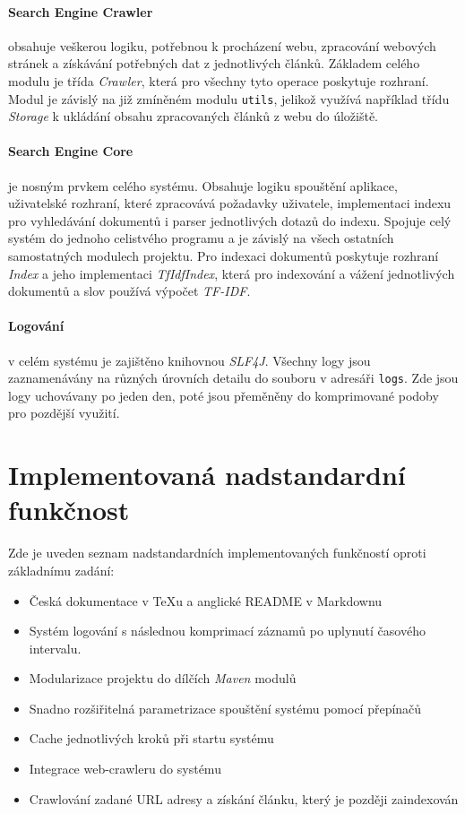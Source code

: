 \documentclass{article}
\begin{document}
\paragraph{Search Engine Crawler} obsahuje veškerou logiku, potřebnou k procházení webu, zpracování webových stránek a získávání potřebných dat z jednotlivých článků. Základem celého modulu je třída \textit{Crawler}, která pro všechny tyto operace poskytuje rozhraní. Modul je závislý na již zmíněném modulu \texttt{utils}, jelikož využívá například třídu \textit{Storage} k ukládání obsahu zpracovaných článků z webu do úložiště.

\paragraph{Search Engine Core} je nosným prvkem celého systému. Obsahuje logiku spouštění aplikace, uživatelské rozhraní, které zpracovává požadavky uživatele, implementaci indexu pro vyhledávání dokumentů i parser jednotlivých dotazů do indexu. Spojuje celý systém do jednoho celistvého programu a je závislý na všech ostatních samostatných modulech projektu. Pro indexaci dokumentů poskytuje rozhraní \textit{Index} a jeho implementaci \textit{TfIdfIndex}, která pro indexování a vážení jednotlivých dokumentů a slov používá výpočet \textit{TF-IDF}.

\paragraph{Logování} v celém systému je zajištěno knihovnou \textit{SLF4J}. Všechny logy jsou zaznamenávány na různých úrovních detailu do souboru v adresáři \texttt{logs}. Zde jsou logy uchovávany po jeden den, poté jsou přeměněny do komprimované podoby pro pozdější využití.

\section{Implementovaná nadstandardní funkčnost}
Zde je uveden seznam nadstandardních implementovaných funkčností oproti základnímu zadání:
\begin{itemize}
    \item Česká dokumentace v TeXu a anglické README v Markdownu 
    \item Systém logování s následnou komprimací záznamů po uplynutí časového intervalu.
    \item Modularizace projektu do dílčích \textit{Maven} modulů
    \item Snadno rozšiřitelná parametrizace spouštění systému pomocí přepínačů
    \item Cache jednotlivých kroků při startu systému
    \item Integrace web-crawleru do systému
    \item Crawlování zadané URL adresy a získání článku, který je později zaindexován
\end{itemize}
\end{document}
